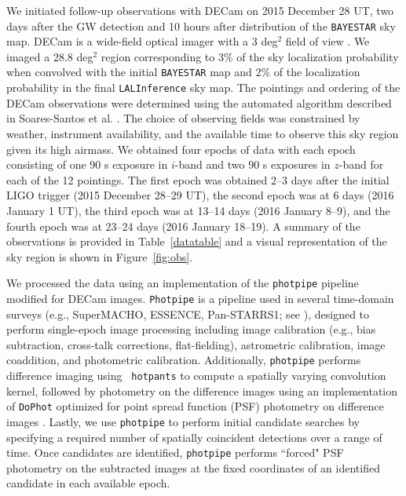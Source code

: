 We initiated follow-up observations with DECam on 2015 December 28 UT,
two days after the GW detection and 10 hours after distribution of the {\tt BAYESTAR}
sky map. DECam is a wide-field optical imager with a 3 deg$^2$ field of view 
\citep{flaugher+15}. We imaged a 28.8 deg$^2$ region corresponding to 3\%
of the sky localization probability when convolved with the initial {\tt BAYESTAR} map 
and 2\% of the localization probability in the final {\tt LALInference} sky map. 
The pointings and ordering of the DECam observations were determined using
the automated algorithm described in Soares-Santos et al. \citeyearpar{ss+16}. The choice 
of observing fields was constrained by weather, instrument availability, and the available
time to observe this sky region given its high airmass. We
obtained four epochs of data with each epoch consisting of one 90 s
exposure in $i$-band and two 90 s exposures in $z$-band for each of the 12 pointings. The first
epoch was obtained 2--3 days after the initial LIGO trigger (2015
December 28--29 UT), the second epoch was at 6 days (2016 January 1
UT), the third epoch was at 13--14 days (2016 January 8--9), and the
fourth epoch was at 23--24 days (2016 January 18--19). A summary of
the observations is provided in Table~\ref{datatable} and a visual
representation of the sky region is shown in
Figure~\ref{fig:obs}.
  
We processed the data using an implementation of the {\tt photpipe} 
pipeline modified for DECam images. {\tt Photpipe} is a
pipeline used in several time-domain surveys (e.g.,
SuperMACHO, ESSENCE, Pan-STARRS1; see \citealt{rest+05,garg+07,mik+07,rest+14}), designed to perform
single-epoch image processing including image calibration (e.g., bias
subtraction, cross-talk corrections, flat-fielding), astrometric
calibration, image coaddition, and photometric calibration.
Additionally, {\tt photpipe} performs difference imaging using {\tt
  hotpants} \citep{alard00,becker15} to compute a spatially varying convolution kernel,
followed by photometry on the difference images using an
implementation of {\tt DoPhot} optimized for point spread function (PSF) photometry on
difference images \citep{schechter+93}. Lastly, we
use {\tt photpipe} to perform initial candidate searches by
specifying a required number of spatially coincident detections over a
range of time. Once candidates are identified, {\tt photpipe} performs
``forced" PSF photometry on the subtracted images at the fixed coordinates of
an identified candidate in each available epoch.

